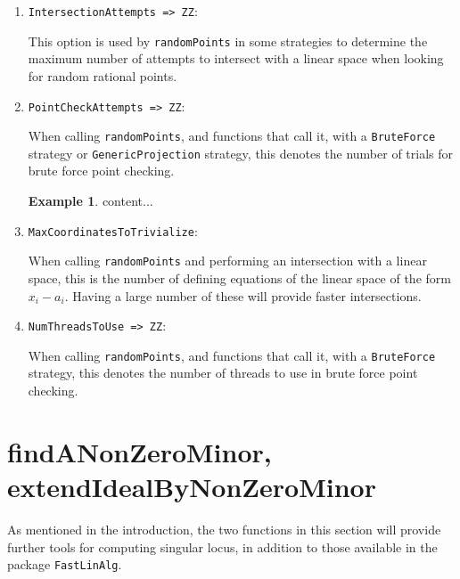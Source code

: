 \documentclass[11pt]{amsart}
\theoremstyle{definition}
\newtheorem{example}{Example}[section]
\begin{document}
\begin{enumerate}
\vspace{1em}
\item {\tt IntersectionAttempts => ZZ}: 

This option is used by {\tt randomPoints} in some strategies to determine the maximum number of attempts to intersect with a linear space when looking for random rational points.  %

\vspace{1em}
\item{\tt PointCheckAttempts => ZZ}:

 When calling {\tt randomPoints}, and functions that call it, with a {\tt BruteForce} strategy or {\tt GenericProjection} strategy, this denotes the number of trials for brute force point checking.
 
 \begin{example}
 	content...
 \end{example}

\vspace{1em}
\item {\tt MaxCoordinatesToTrivialize}:

When calling {\tt randomPoints} and performing an intersection with a linear space, this is the number of defining equations of the linear space of the form $x_i - a_i$.  Having a large number of these will provide faster intersections.

\vspace{1em}
\item {\tt NumThreadsToUse => ZZ}:

When calling {\tt randomPoints}, and functions that call it, with a {\tt BruteForce} strategy, this denotes the number of threads to use in brute force point checking.
\end{enumerate}

\section{findANonZeroMinor, extendIdealByNonZeroMinor}

As mentioned in the introduction, the two functions in this section will provide further tools for computing singular locus, in addition to those available in the package {\tt FastLinAlg}. 
\end{document}
